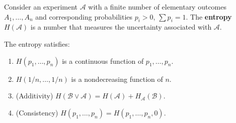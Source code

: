 Consider an experiment $\mathscr{A}$ with a finite number of elementary outcomes $A_1, \dots, A_n$ and corresponding probabilities $p_i > 0$, $\sum p_i = 1$. The \textbf{entropy} $H(\mathscr{A})$ is a number that measures the uncertainty associated with $\mathscr{A}$.

The entropy satisfies:
\begin{enumerate}
\item $H(p_1, \dots, p_n)$ is a continuous function of $p_1, \dots, p_n$.
\item $H(1/n, \dots, 1/n)$ is a nondecreasing function of $n$.
\item (Additivity) $H(\mathscr{B} \vee \mathscr{A}) = H(\mathscr{A}) + H_{\mathscr{A}}(\mathscr{B})$.
\item (Consistency) $H(p_1, \dots, p_n) = H(p_1, \dots, p_n, 0)$.
\end{enumerate}
